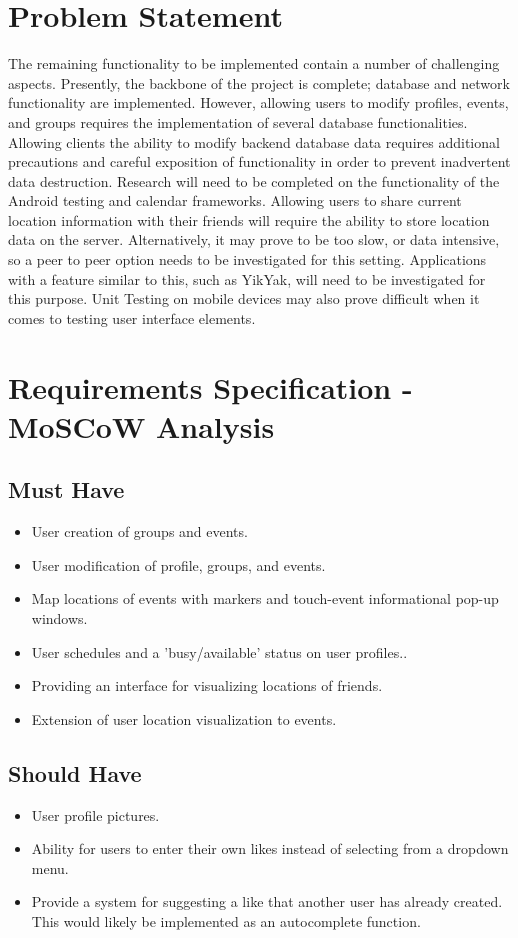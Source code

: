 \documentclass[11pt]{article}
\begin{document}
\section{Problem Statement}

The remaining functionality to be implemented contain a number of challenging aspects. Presently, 
the backbone of the project is complete; database and network functionality are implemented. However,
allowing users to modify profiles, events, and groups requires the implementation of several database
functionalities. Allowing clients the ability to modify backend database data requires additional
precautions and careful exposition of functionality in order to prevent inadvertent data destruction. 
Research will need to be completed on the functionality of the Android testing and calendar frameworks.
Allowing users to share current location information with their friends will require the ability
to store location data on the server. Alternatively, it may prove to be too slow, or data intensive,
so a peer to peer option needs to be investigated for this setting. Applications with a feature similar to this, such as YikYak\cite{yikyak},
will need to be investigated for this purpose. Unit Testing on mobile devices may also prove difficult when
it comes to testing user interface elements.


\newpage
\section{Requirements Specification - MoSCoW Analysis}

\subsection{Must Have}
\begin{itemize}
\item User creation of groups and events.
\item User modification of profile, groups, and events.
\item Map locations of events with markers and touch-event informational pop-up windows.
\item User schedules and a 'busy/available' status on user profiles..
\item Providing an interface for visualizing locations of friends.
\item Extension of user location visualization to events.
\end{itemize}
\subsection{Should Have}
\begin{itemize}
\item User profile pictures.
\item Ability for users to enter their own likes instead of selecting from a dropdown menu.
\item Provide a system for suggesting a like that another user has already created. 
This would likely be implemented as an autocomplete function.
\end{itemize}
\end{document}
